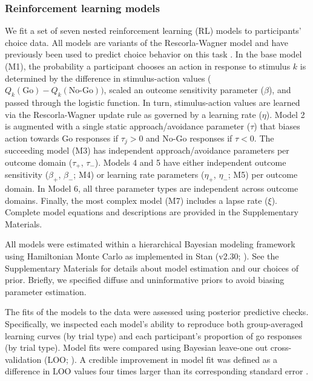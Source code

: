 \documentclass[a4paper,12pt]{article}
\begin{document}
\begin{refsection}[main]
\subsubsection*{Reinforcement learning models}

We fit a set of seven nested reinforcement learning (RL) models to participants' choice data. All models are variants of the Rescorla-Wagner model and have previously been used to predict choice behavior on this task \cite{guitart2012go, mkrtchian2017modeling, moutoussis2018change, swart2017catecholaminergic}. In the base model (M1), the probability a participant chooses an action in response to stimulus $k$ is determined by the difference in stimulus-action values ($Q_k(\text{Go}) - Q_k(\text{No-Go}))$, scaled an outcome sensitivity parameter ($\beta$), and passed through the logistic function. In turn, stimulus-action values are learned via the Rescorla-Wagner update rule as governed by a learning rate ($\eta$). Model 2 is augmented with a single static approach/avoidance parameter ($\tau$) that biases action towards Go responses if $\tau_j > 0$ and No-Go responses if $\tau < 0$. The succeeding model (M3) has independent approach/avoidance parameters per outcome domain ($\tau_+$, $\tau_-$). Models 4 and 5 have either independent outcome sensitivity ($\beta_+$, $\beta_-$; M4) or learning rate parameters ($\eta_+$, $\eta_-$; M5) per outcome domain. In Model 6, all three parameter types are independent across outcome domains. Finally, the most complex model (M7) includes a lapse rate ($\xi$). Complete model equations and descriptions are provided in the Supplementary Materials.

All models were estimated within a hierarchical Bayesian modeling framework using Hamiltonian Monte Carlo as implemented in Stan (v2.30; \cite{carpenter2017stan}). See the Supplementary Materials for details about model estimation and our choices of prior. Briefly, we specified diffuse and uninformative priors to avoid biasing parameter estimation.

The fits of the models to the data were assessed using posterior predictive checks. Specifically, we inspected each model's ability to reproduce both group-averaged learning curves (by trial type) and each participant's proportion of go responses (by trial type). Model fits were compared using Bayesian leave-one out cross-validation (LOO; \cite{vehtari2017practical}). A credible improvement in model fit was defined as a difference in LOO values four times larger than its corresponding standard error \cite{Vehtari_undated-tc}.


\end{refsection}
\end{document}

